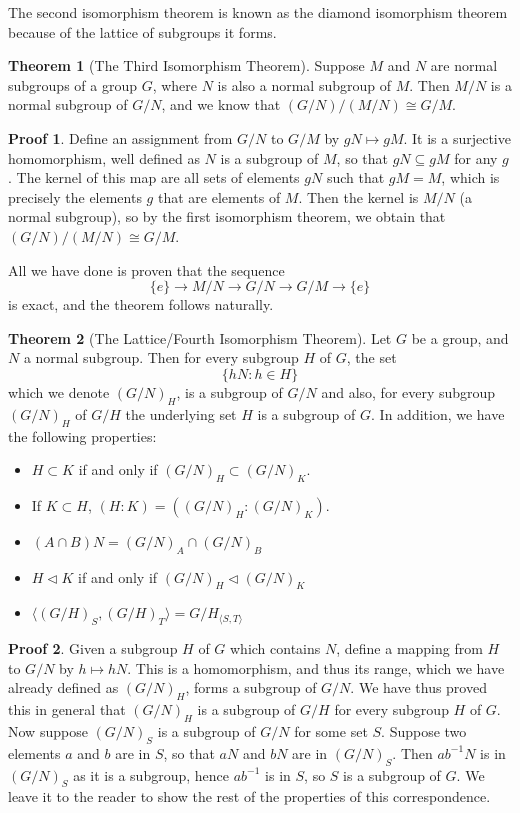 \documentclass[12pt]{amsbook}
\theoremstyle{definition}
\newtheorem{theorem}{Theorem}[chapter]
\newtheorem*{prf}{Proof}
\newcommand{\gen}[1]{\langle #1 \rangle} %
\begin{document}
The second isomorphism theorem is known as the diamond isomorphism theorem because of the lattice of subgroups it forms.

\begin{theorem}[The Third Isomorphism Theorem] 
    Suppose $M$ and $N$ are normal subgroups of a group $G$, where $N$ is also a normal subgroup of $M$. Then $M/N$ is a normal subgroup of $G/N$, and we know that $(G/N)/(M/N) \cong G/M$.
\end{theorem}
\begin{prf}
    Define an assignment from $G/N$ to $G/M$ by $gN \mapsto gM$. It is a surjective homomorphism, well defined as $N$ is a subgroup of $M$, so that $gN \subseteq gM$ for any $g$. The kernel of this map are all sets of elements $gN$ such that $gM = M$, which is precisely the elements $g$ that are elements of $M$. Then the kernel is $M/N$ (a normal subgroup), so by the first isomorphism theorem, we obtain that $(G/N)/(M/N) \cong G/M$.
\end{prf}

All we have done is proven that the sequence
%
\[ \{e\} \xrightarrow{} M/N \xrightarrow{} G/N \xrightarrow{} G/M \xrightarrow{} \{e\} \]
%
is exact, and the theorem follows naturally.

\begin{theorem}[The Lattice/Fourth Isomorphism Theorem]  
Let $G$ be a group, and $N$ a normal subgroup. Then for every subgroup $H$ of $G$, the set
%
\[ \{ hN : h \in H \} \]
%
which we denote $(G/N)_H$, is a subgroup of $G/N$ and also, for every subgroup $(G/N)_H$ of $G/H$ the underlying set $H$ is a subgroup of $G$. In addition, we have the following properties:
\vspace{-3mm}
\begin{itemize}
    \item $H \subset K$ if and only if $(G/N)_H \subset (G/N)_K$.
    \item If $K \subset H$, $(H:K) = ((G/N)_H:(G/N)_K)$.
    \item $(A \cap B)N = (G/N)_A \cap (G/N)_B$
    \item $H \lhd K$ if and only if $(G/N)_H \lhd (G/N)_K$
    \item $\gen{(G/H)_S, (G/H)_T} = G/H_{\gen{S, T}}$
\end{itemize}
\end{theorem}
\begin{prf}
    Given a subgroup $H$ of $G$ which contains $N$, define a mapping from $H$ to $G/N$ by $h \mapsto hN$. This is a homomorphism, and thus its range, which we have already defined as $(G/N)_H$, forms a subgroup of $G/N$. We have thus proved this in general that $(G/N)_H$ is a subgroup of $G/H$ for every subgroup $H$ of $G$. Now suppose $(G/N)_S$ is a subgroup of $G/N$ for some set $S$. Suppose two elements $a$ and $b$ are in $S$, so that $aN$ and $bN$ are in $(G/N)_S$. Then $ab^{-1}N$ is in $(G/N)_S$ as it is a subgroup, hence $ab^{-1}$ is in $S$, so $S$ is a subgroup of $G$. We leave it to the reader to show the rest of the properties of this correspondence.
\end{prf}
\end{document}
